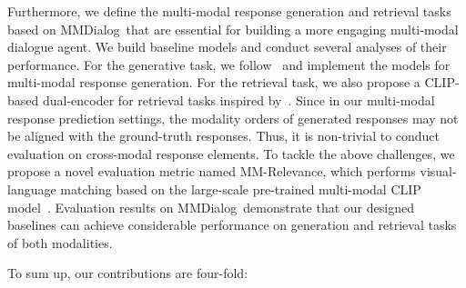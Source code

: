 \documentclass[11pt]{article}
\newcommand{\DataName}{MMDialog}
\begin{document}
Furthermore, we define the multi-modal response generation and retrieval tasks based on \DataName~that are essential for building a more engaging multi-modal dialogue agent. We build baseline models and conduct several analyses of their performance. For the generative task, we follow~\citet{sun-etal-2022-multimodal} and implement the models for multi-modal response generation. For the retrieval task, we also propose a CLIP-based dual-encoder for retrieval tasks inspired by~\citet{zang-etal-2021-photochat}. Since in our multi-modal response prediction settings, the modality orders of generated responses may not be aligned with the ground-truth responses. Thus, it is non-trivial to conduct evaluation on cross-modal response elements. To tackle the above challenges, we propose a novel evaluation metric named MM-Relevance, which performs visual-language matching based on the large-scale pre-trained multi-modal CLIP model~\cite{radford2021learning}. Evaluation results on \DataName~demonstrate that our designed baselines can achieve considerable performance on generation and retrieval tasks of both modalities.








To sum up, our contributions are four-fold:
\end{document}
